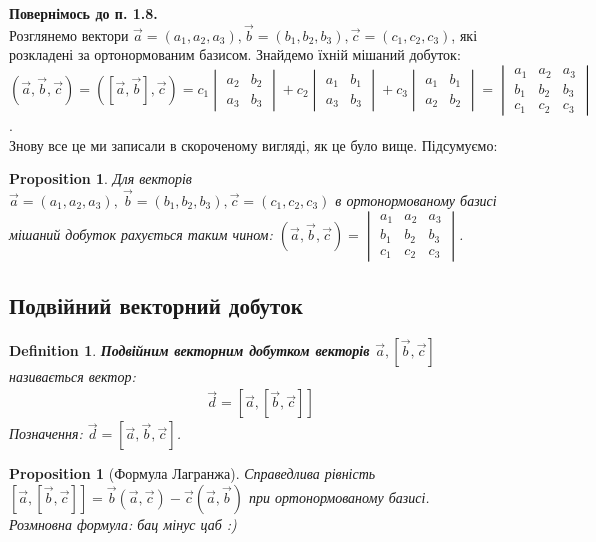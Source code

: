 \documentclass[a4paper, 10pt]{extarticle}
\theoremstyle{theoremdd}
\theoremstyle{theoremdd}
\newtheorem{definition}[theorem]{Definition}
\theoremstyle{theoremdd}
\theoremstyle{theoremdd}
\theoremstyle{theoremdd}
\newtheorem{proposition}[theorem]{Proposition}
\theoremstyle{theoremdd}
\theoremstyle{theoremdd}
\theoremstyle{theoremdd}
\begin{document}
\textbf{Повернімось до п. 1.8.}\\
Розглянемо вектори $\vec{a} = (a_1,a_2,a_3), \vec{b} = (b_1,b_2,b_3), \vec{c} = (c_1,c_2,c_3)$, які розкладені за ортонормованим базисом. Знайдемо їхній мішаний добуток:\\
$(\vec{a}, \vec{b}, \vec{c}) = ([\vec{a}, \vec{b}], \vec{c}) = c_1 \begin{vmatrix} a_2 & b_2 \\ a_3 & b_3 \end{vmatrix} + c_2 \begin{vmatrix} a_1 & b_1 \\ a_3 & b_3 \end{vmatrix} + c_3 \begin{vmatrix} a_1 & b_1 \\ a_2 & b_2 \end{vmatrix} = \begin{vmatrix}
a_1 & a_2 & a_3 \\
b_1 & b_2 & b_3 \\
c_1 & c_2 & c_3
\end{vmatrix}$.\\
Знову все це ми записали в скороченому вигляді, як це було вище. Підсумуємо:
\begin{proposition}
Для векторів $\vec{a} = (a_1,a_2,a_3),\ \vec{b} = (b_1,b_2,b_3), \vec{c} = (c_1,c_2,c_3)$ в ортонормованому базисі мішаний добуток рахується таким чином: $(\vec{a},\vec{b},\vec{c}) = \begin{vmatrix}
a_1 & a_2 & a_3 \\
b_1 & b_2 & b_3 \\
c_1 & c_2 & c_3
\end{vmatrix}$.
\end{proposition}

\subsection{Подвійний векторний добуток}
\begin{definition}
\textbf{Подвійним векторним добутком векторів $\vec{a}, [\vec{b},\vec{c}]$} називається вектор:
\begin{align*}
\vec{d} = [\vec{a},[\vec{b},\vec{c}]]
\end{align*}
Позначення: $\vec{d} = [\vec{a},\vec{b},\vec{c}]$.
\end{definition}

\begin{proposition}[Формула Лагранжа]
Справедлива рівність $[\vec{a},[\vec{b},\vec{c}]] = \vec{b} (\vec{a}, \vec{c}) - \vec{c} (\vec{a}, \vec{b})$ при ортонормованому базисі.\\
\textit{Розмновна формула: бац мінус цаб :)}
\end{proposition}
\end{document}
